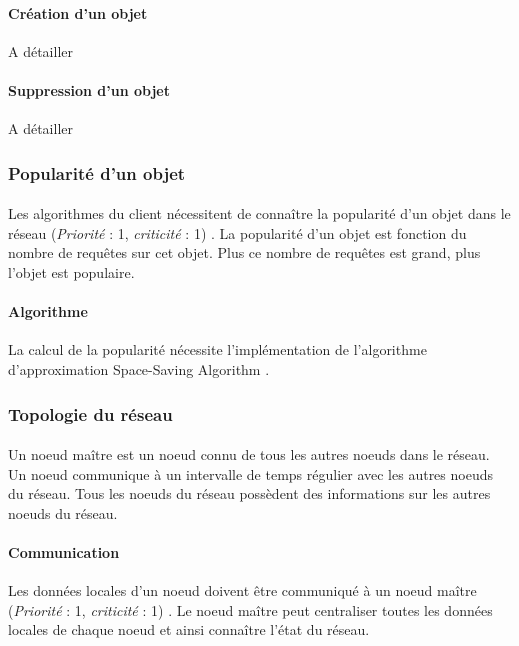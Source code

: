 \documentclass[12pt]{article}
\newcommand{\besoin}[2] {
  (\textit{Priorité} : #1, \textit{criticité} : #2)
}
\begin{document}
\paragraph{Création d'un objet} A détailler

\paragraph{Suppression d'un objet} A détailler


\subsubsection{Popularité d'un objet}

\paragraph{} Les algorithmes du client nécessitent de connaître la popularité d'un objet dans le réseau \besoin{1}{1}.
La popularité d'un objet est fonction du nombre de requêtes sur cet objet. Plus ce nombre de requêtes est grand, plus l'objet est populaire.

\paragraph{Algorithme} La calcul de la popularité nécessite l'implémentation de l'algorithme d'approximation Space-Saving Algorithm \cite{SpaceSaving}.


\subsubsection{Topologie du réseau}

\paragraph{} Un noeud maître est un noeud connu de tous les autres noeuds dans le réseau. 
Un noeud communique à un intervalle de temps régulier avec les autres noeuds du réseau. 
Tous les noeuds du réseau possèdent des informations sur les autres noeuds du réseau.

\paragraph{Communication} Les données locales d'un noeud doivent être communiqué à un noeud maître \besoin{1}{1}.
Le noeud maître peut centraliser toutes les données locales de chaque noeud et ainsi connaître l'état du réseau.
\end{document}
